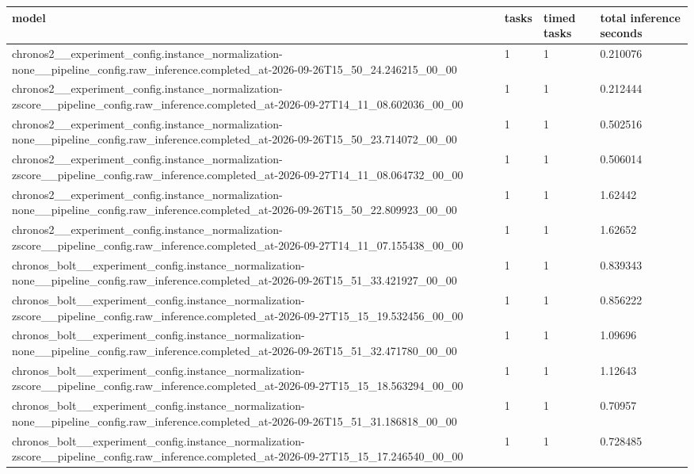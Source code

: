 \begin{tabular}{llll}
\toprule
model & tasks & timed tasks & total inference seconds \\
\midrule
chronos2\_\_experiment\_config.instance\_normalization-none\_\_pipeline\_config.raw\_inference.completed\_at-2026-09-26T15\_50\_24.246215\_00\_00 & 1 & 1 & 0.210076 \\
chronos2\_\_experiment\_config.instance\_normalization-zscore\_\_pipeline\_config.raw\_inference.completed\_at-2026-09-27T14\_11\_08.602036\_00\_00 & 1 & 1 & 0.212444 \\
chronos2\_\_experiment\_config.instance\_normalization-none\_\_pipeline\_config.raw\_inference.completed\_at-2026-09-26T15\_50\_23.714072\_00\_00 & 1 & 1 & 0.502516 \\
chronos2\_\_experiment\_config.instance\_normalization-zscore\_\_pipeline\_config.raw\_inference.completed\_at-2026-09-27T14\_11\_08.064732\_00\_00 & 1 & 1 & 0.506014 \\
chronos2\_\_experiment\_config.instance\_normalization-none\_\_pipeline\_config.raw\_inference.completed\_at-2026-09-26T15\_50\_22.809923\_00\_00 & 1 & 1 & 1.62442 \\
chronos2\_\_experiment\_config.instance\_normalization-zscore\_\_pipeline\_config.raw\_inference.completed\_at-2026-09-27T14\_11\_07.155438\_00\_00 & 1 & 1 & 1.62652 \\
chronos\_bolt\_\_experiment\_config.instance\_normalization-none\_\_pipeline\_config.raw\_inference.completed\_at-2026-09-26T15\_51\_33.421927\_00\_00 & 1 & 1 & 0.839343 \\
chronos\_bolt\_\_experiment\_config.instance\_normalization-zscore\_\_pipeline\_config.raw\_inference.completed\_at-2026-09-27T15\_15\_19.532456\_00\_00 & 1 & 1 & 0.856222 \\
chronos\_bolt\_\_experiment\_config.instance\_normalization-none\_\_pipeline\_config.raw\_inference.completed\_at-2026-09-26T15\_51\_32.471780\_00\_00 & 1 & 1 & 1.09696 \\
chronos\_bolt\_\_experiment\_config.instance\_normalization-zscore\_\_pipeline\_config.raw\_inference.completed\_at-2026-09-27T15\_15\_18.563294\_00\_00 & 1 & 1 & 1.12643 \\
chronos\_bolt\_\_experiment\_config.instance\_normalization-none\_\_pipeline\_config.raw\_inference.completed\_at-2026-09-26T15\_51\_31.186818\_00\_00 & 1 & 1 & 0.70957 \\
chronos\_bolt\_\_experiment\_config.instance\_normalization-zscore\_\_pipeline\_config.raw\_inference.completed\_at-2026-09-27T15\_15\_17.246540\_00\_00 & 1 & 1 & 0.728485 \\

\end{tabular}
